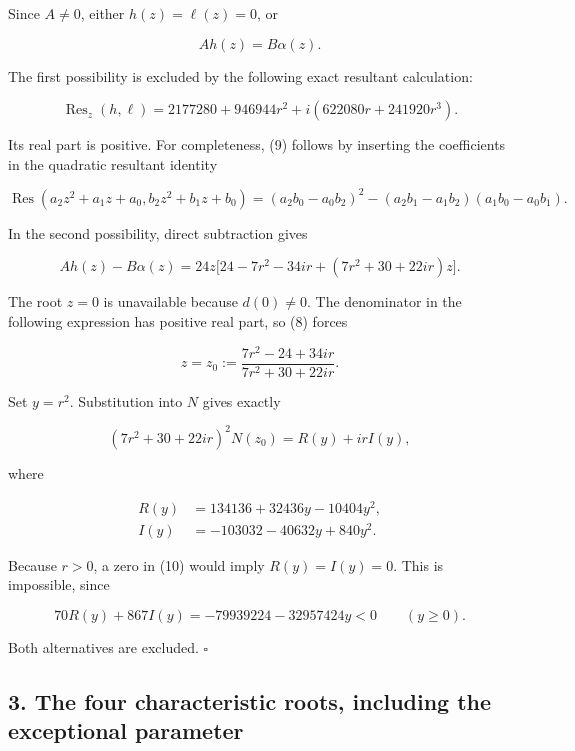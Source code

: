 \documentclass[10pt,a4paper]{article}
\begin{document}
Since \(A\ne0\), either \(h(z)=\ell(z)=0\), or

\nopagebreak[4]

\[
Ah(z)=B\alpha(z).
\tag{8}
\]

The first possibility is excluded by the following exact resultant
calculation:

\nopagebreak[4]

\[
\operatorname{Res}_z(h,\ell)
=2177280+946944r^2+i(622080r+241920r^3).
\tag{9}
\]


Its real part is positive. For completeness, (9) follows by inserting
the coefficients in the quadratic resultant identity

\nopagebreak[4]

\[
\operatorname{Res}(a_2z^2+a_1z+a_0,b_2z^2+b_1z+b_0)
=(a_2b_0-a_0b_2)^2
 -(a_2b_1-a_1b_2)(a_1b_0-a_0b_1).
\]

In the second possibility, direct subtraction gives

\nopagebreak[4]

\[
Ah(z)-B\alpha(z)
=24z\bigl[24-7r^2-34ir+(7r^2+30+22ir)z\bigr].
\]


The root \(z=0\) is unavailable because \(d(0)\ne0\). The denominator in
the following expression has positive real part, so (8) forces

\nopagebreak[4]

\[
z=z_0:=\frac{7r^2-24+34ir}{7r^2+30+22ir}.
\]

Set \(y=r^2\). Substitution into \(N\) gives exactly

\nopagebreak[4]

\[
(7r^2+30+22ir)^2N(z_0)=R(y)+irI(y),
\tag{10}
\]

where

\nopagebreak[4]

\[
\begin{aligned}
R(y)&=134136+32436y-10404y^2,\\
I(y)&=-103032-40632y+840y^2.
\end{aligned}
\]

Because \(r>0\), a zero in (10) would imply \(R(y)=I(y)=0\). This is
impossible, since

\nopagebreak[4]

\[
70R(y)+867I(y)=-79939224-32957424y<0
\qquad(y\ge0).
\tag{11}
\]

Both alternatives are excluded. \(\square\)

\subsection{3. The four characteristic roots, including the exceptional
parameter}\label{the-four-characteristic-roots-including-the-exceptional-parameter}
\end{document}
